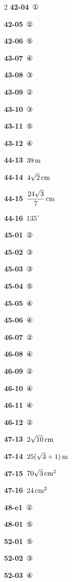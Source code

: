 \documentclass[10pt,a4paper]{article}
\begin{document}
\begin{multicols}{2}
\noindent\textbf{42-04}\ ①\par
\noindent\textbf{42-05}\ ②\par
\noindent\textbf{42-06}\ ⑤\par
\noindent\textbf{43-07}\ ④\par
\noindent\textbf{43-08}\ ③\par
\noindent\textbf{43-09}\ ②\par
\noindent\textbf{43-10}\ ③\par
\noindent\textbf{43-11}\ ⑤\par
\noindent\textbf{43-12}\ ④\par
\noindent\textbf{44-13}\ $39\mkern3mu \mathrm{m}$\par
\noindent\textbf{44-14}\ $4\sqrt{2}\mkern3mu \mathrm{cm}$\par
\noindent\textbf{44-15}\ $\dfrac{24\sqrt{3}}{7}\mkern3mu \mathrm{cm}$\par
\noindent\textbf{44-16}\ $135^\circ$\par
\noindent\textbf{45-01}\ ②\par
\noindent\textbf{45-02}\ ③\par
\noindent\textbf{45-03}\ ③\par
\noindent\textbf{45-04}\ ⑤\par
\noindent\textbf{45-05}\ ④\par
\noindent\textbf{45-06}\ ④\par
\noindent\textbf{46-07}\ ②\par
\noindent\textbf{46-08}\ ④\par
\noindent\textbf{46-09}\ ②\par
\noindent\textbf{46-10}\ ④\par
\noindent\textbf{46-11}\ ④\par
\noindent\textbf{46-12}\ ②\par
\noindent\textbf{47-13}\ $2\sqrt{10}\mkern3mu \mathrm{cm}$\par
\noindent\textbf{47-14}\ $25(\sqrt{3}+1)\mkern3mu \mathrm{m}$\par
\noindent\textbf{47-15}\ $70\sqrt{3}\mkern3mu \mathrm{cm}^2$\par
\noindent\textbf{47-16}\ $24\mkern3mu \mathrm{cm}^2$\par
\noindent\textbf{48-e1}\ ②\par
\noindent\textbf{48-01}\ ⑤\par
\noindent\textbf{52-01}\ ⑤\par
\noindent\textbf{52-02}\ ③\par
\noindent\textbf{52-03}\ ④\par

\end{multicols}
\end{document}
